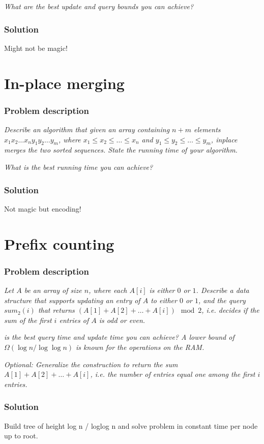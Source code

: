 \documentclass[a4paper,oneside,article,11pt]{memoir}
\begin{document}
\textit{What are the best update and query bounds you can achieve?}

\subsection{Solution}
Might not be magic!

\chapter{In-place merging}
\label{chp:inplace}
\subsection{Problem description}
\textit{Describe an algorithm that given an array containing $n+m$ elements $x_1x_2\dots x_ny_1y_2\dots y_m$, where $x_1\leq x_2\leq \dots \leq x_n$ and $y_1\leq y_2\leq \dots \leq y_m$, inplace merges the two sorted sequences. State the running time of your algorithm.}

\textit{What is the best running time you can achieve?}

\subsection{Solution}
Not magic but encoding!

\chapter{Prefix counting}
\label{chp:prefix}
\subsection{Problem description}
\textit{Let $A$ be an array of size $n$, where each $A\left[i\right]$ is either $0$ or $1$. Describe a data structure that supports updating an entry of $A$ to either $0$ or $1$, and the query $sum_2\left(i\right)$ that returns $\left(A\left[1\right]+A\left[2\right]+\dots+A\left[i\right]\right) \mod 2$, i.e. decides if the sum of the first $i$ entries of $A$ is odd or even.}

\textit{ is the best query time and update time you can achieve? A lower bound of $\Omega(\log n/\log\log n)$ is known for the operations on the RAM.}

\textit{Optional: Generalize the construction to return the sum $A[1]+A[2]+\dots+A[i]$, i.e. the number of entries equal one among the first $i$ entries.}

\subsection{Solution}
Build tree of height log n / loglog n and solve problem in constant time per node up to root.


\end{document}
